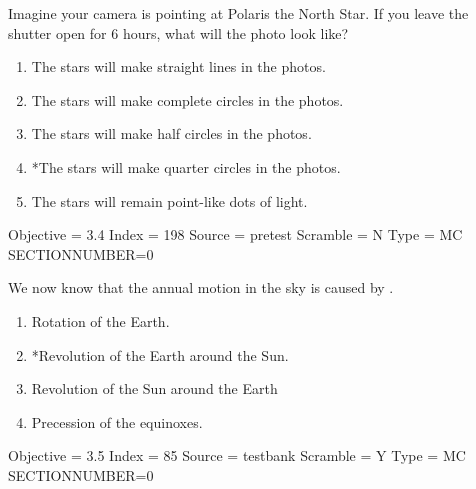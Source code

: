 \documentclass[11pt]{article}
\begin{document}
\begin{enumerate}
\begin{minipage}{\textwidth}
\begin{minipage}{\textwidth}
\item Imagine your camera is pointing at Polaris the North Star.  If you leave the shutter open for 6 hours, what will the photo look like?
\begin{enumerate} 
\setlength{\itemsep}{1pt} 
\setlength{\parskip}{0pt} 
\setlength{\parsep}{0pt}
\setlength{\multicolsep}{1pt} 
\item The stars will make straight lines in the photos.
\item The stars will make complete circles in the photos.
\item The stars will make half circles in the photos.
\item *The stars will make quarter circles in the photos.
\item The stars will remain point-like dots of light.
\end{enumerate} 
Objective = 3.4
Index = 198
Source = pretest
Scramble = N
Type = MC
SECTIONNUMBER=0
\end{minipage}
\end{minipage}
\vskip 0.20in

\begin{minipage}{\textwidth}
\begin{minipage}{\textwidth}
\item We now know that the annual motion in the sky is caused by \underline{\hspace{0.5in}}.
\begin{multicols}{2}
\begin{enumerate} 
\setlength{\itemsep}{1pt} 
\setlength{\parskip}{0pt} 
\setlength{\parsep}{0pt}
\setlength{\multicolsep}{1pt} 
\item Rotation of the Earth.
\item *Revolution of the Earth around the Sun.
\item Revolution of the Sun around the Earth
\item Precession of the equinoxes.
\end{enumerate} 
\vfill 
\end{multicols}

Objective = 3.5
Index = 85
Source = testbank
Scramble = Y
Type = MC
SECTIONNUMBER=0
\end{minipage}
\end{minipage}
\vskip 0.20in


\end{enumerate}
\end{document}
